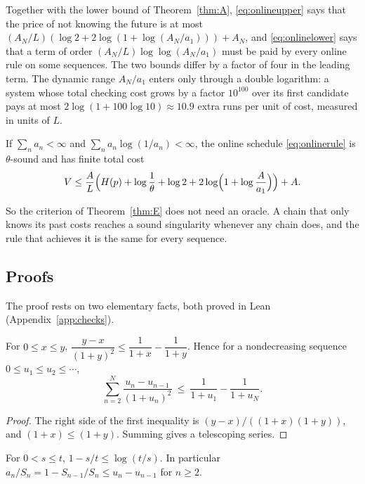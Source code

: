 Together with the lower bound of Theorem~\ref{thm:A}, \eqref{eq:onlineupper} says that the price of not knowing the future is at most $(A_{N}/L)(\log2+2\log(1+\log(A_{N}/a_{1})))+A_{N}$, and \eqref{eq:onlinelower} says that a term of order $(A_{N}/L)\log\log(A_{N}/a_{1})$ must be paid by every online rule on some sequences. The two bounds differ by a factor of four in the leading term. The dynamic range $A_{N}/a_{1}$ enters only through a double logarithm: a system whose total checking cost grows by a factor $10^{100}$ over its first candidate pays at most $2\log(1+100\log10)\approx10.9$ extra runs per unit of cost, measured in units of $L$.

\begin{corollary}\label{cor:onlinesing}
If $\sum_{n}a_{n}<\infty$ and $\sum_{n}a_{n}\log(1/a_{n})<\infty$, the online schedule \eqref{eq:onlinerule} is $\theta$-sound and has finite total cost
\[
V\le\frac{A}{L}\Bigl(H(p)+\log\frac1\theta+\log2+2\log\Bigl(1+\log\frac{A}{a_{1}}\Bigr)\Bigr)+A .
\]
\end{corollary}

So the criterion of Theorem~\ref{thm:E} does not need an oracle. A chain that only knows its past costs reaches a sound singularity whenever any chain does, and the rule that achieves it is the same for every sequence.

\subsection{Proofs}

The proof rests on two elementary facts, both proved in Lean (Appendix~\ref{app:checks}).

\begin{lemma}[Telescoping]\label{lem:telescope}
For $0\le x\le y$, $\dfrac{y-x}{(1+y)^{2}}\le\dfrac1{1+x}-\dfrac1{1+y}$. Hence for a nondecreasing sequence $0\le u_{1}\le u_{2}\le\cdots$,
\[
\sum_{n=2}^{N}\frac{u_{n}-u_{n-1}}{(1+u_{n})^{2}}\ \le\ \frac1{1+u_{1}}-\frac1{1+u_{N}}.
\]
\end{lemma}

\begin{proof}
The right side of the first inequality is $(y-x)/((1+x)(1+y))$, and $(1+x)\le(1+y)$. Summing gives a telescoping series.
\end{proof}

\begin{lemma}\label{lem:share}
For $0<s\le t$, $1-s/t\le\log(t/s)$. In particular $a_{n}/S_{n}=1-S_{n-1}/S_{n}\le u_{n}-u_{n-1}$ for $n\ge2$.
\end{lemma}

